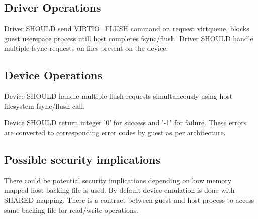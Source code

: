 \subsection{Driver Operations}\label{sec:Device Types / PMEM Driver / Driver Operation}

Driver SHOULD send VIRTIO_FLUSH command on request virtqueue,
blocks guest userspace process utill host completes fsync/flush.
Driver SHOULD handle multiple fsync requests on files present
on the device.

\subsection{Device Operations}\label{sec:Device Types / PMEM Driver / Device Operation}


Device SHOULD handle multiple flush requests simultaneously using
host filesystem fsync/flush call.


Device SHOULD return integer '0' for success and '-1' for failure.
These errors are converted to corresponding error codes by guest as
per architecture.

\subsection{Possible security implications}\label{sec:Device Types / PMEM Device / Possible Security Implications}

There could be potential security implications depending on how
memory mapped host backing file is used. By default device emulation
is done with SHARED mapping. There is a contract between guest and host
process to access same backing file for read/write operations.

